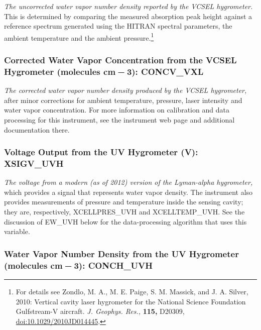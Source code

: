 \documentclass[
]{book}
\begin{document}
\emph{The uncorrected water vapor number density reported by the VCSEL hygrometer.} This is determined by comparing the measured absorption peak height against a reference spectrum generated using the HITRAN spectral parameters, the ambient temperature and the ambient pressure.\footnote{For details see Zondlo, M. A., M. E. Paige, S. M. Massick, and J. A. Silver, 2010: Vertical cavity laser hygrometer for the National Science Foundation Gulfstream-V aircraft. \emph{J. Geophys. Res.,} \textbf{115,} D20309, \url{doi:10.1029/2010JD014445}.}

\hypertarget{vcsel-corr}{%
\subsubsection*{\texorpdfstring{Corrected Water Vapor Concentration from the VCSEL Hygrometer (molecules cm{ − 3}): CONCV\_VXL}{Corrected Water Vapor Concentration from the VCSEL Hygrometer (molecules cm − 3): CONCV\_VXL}}\label{vcsel-corr}}

\emph{The corrected water vapor number density produced by the VCSEL hygrometer,} after minor corrections for ambient temperature, pressure, laser intensity and water vapor concentration. For more information on calibration and data processing for this instrument, see the instrument web page and additional documentation there.

\hypertarget{uvh-voltage}{%
\subsubsection*{Voltage Output from the UV Hygrometer (V): XSIGV\_UVH}\label{uvh-voltage}}

\emph{The voltage from a modern (as of 2012) version of the Lyman-alpha hygrometer,} which provides a signal that represents water vapor density. The instrument also provides measurements of pressure and temperature inside the sensing cavity; they are, respectively, XCELLPRES\_UVH and XCELLTEMP\_UVH. See the discussion of EW\_UVH below for the data-processing algorithm that uses this variable.

\hypertarget{uvh-n}{%
\subsubsection*{\texorpdfstring{Water Vapor Number Density from the UV Hygrometer (molecules cm{ − 3}): CONCH\_UVH}{Water Vapor Number Density from the UV Hygrometer (molecules cm − 3): CONCH\_UVH}}\label{uvh-n}}
\end{document}
